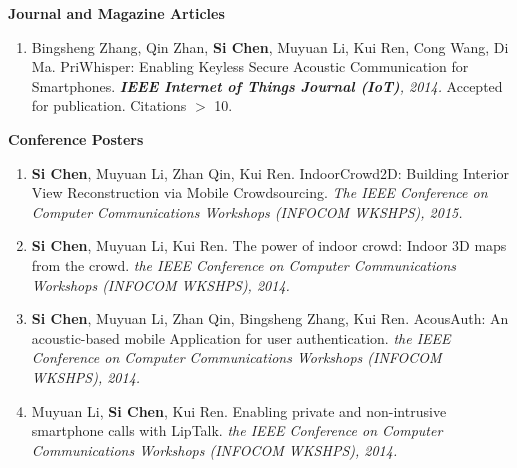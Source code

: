 \documentclass[letter]{article}
\newcommand{\publication}[4]{\item #1. #2. \emph{#3.} #4}
\begin{document}
\begin{description}
\begin{enumerate}[{C-}1.]


\end{enumerate}

\textbf{Journal and Magazine Articles}

\begin{enumerate}[{J-}1.]



\publication{Bingsheng Zhang, Qin Zhan, \textbf{Si Chen}, Muyuan Li, Kui Ren, Cong Wang, Di Ma} {PriWhisper: Enabling Keyless Secure Acoustic Communication for Smartphones}
{\textbf{IEEE Internet of Things Journal (IoT)}, 2014}
{Accepted for publication. Citations $>$ 10}.

\end{enumerate}
\textbf{Conference Posters}


\begin{enumerate}[{P-}1.]

\publication{\textbf{Si Chen}, Muyuan Li, Zhan Qin, Kui Ren} {IndoorCrowd2D: Building Interior View Reconstruction via Mobile Crowdsourcing}
{The IEEE Conference on Computer Communications Workshops (INFOCOM WKSHPS), 2015}{}

\publication{\textbf{Si Chen}, Muyuan Li, Kui Ren} {The power of indoor crowd: Indoor 3D maps from the crowd}
{the IEEE Conference on Computer Communications Workshops (INFOCOM WKSHPS), 2014}{}

\publication{\textbf{Si Chen}, Muyuan Li, Zhan Qin, Bingsheng Zhang, Kui Ren} {AcousAuth: An acoustic-based mobile Application for user authentication}
{the IEEE Conference on Computer Communications Workshops (INFOCOM WKSHPS), 2014}{}

\publication{Muyuan Li, \textbf{Si Chen}, Kui Ren} {Enabling private and non-intrusive smartphone calls with LipTalk}
{the IEEE Conference on Computer Communications Workshops (INFOCOM WKSHPS), 2014}{}


\end{enumerate}
\end{description}
\end{document}
